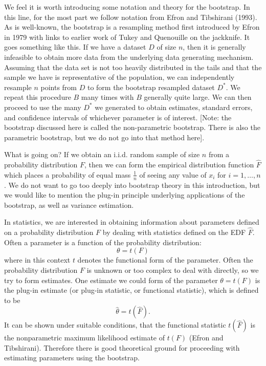 \documentclass[12pt,twoside]{reedthesis}
\theoremstyle{definition}
\theoremstyle{definition}
\theoremstyle{definition}
\theoremstyle{remark}
\begin{document}
We feel it is worth introducing some notation and theory for the
bootstrap. In this line, for the most part we follow notation from Efron
and Tibshirani (1993). As is well-known, the bootstrap is a resampling
method first introduced by Efron in 1979 with links to earlier work of
Tukey and Quenouille on the jackknife. It goes something like this. If
we have a dataset \(D\) of size \(n\), then it is generally infeasible
to obtain more data from the underlying data generating mechanism.
Assuming that the data set is not too heavily distributed in the tails
and that the sample we have is representative of the population, we can
independently resample \(n\) points from \(D\) to form the bootstrap
resampled dataset \(D^*\). We repeat this procedure \(B\) many times
with \(B\) generally quite large. We can then proceed to use the many
\(D^*\) we generated to obtain estimates, standard errors, and
confidence intervals of whichever parameter is of interest. {[}Note: the
bootstrap discussed here is called the non-parametric bootstrap. There
is also the parametric bootstrap, but we do not go into that method
here{]}.

What is going on? If we obtain an i.i.d. random sample of size \(n\)
from a probability distribution \(F\), then we can form the empirical
distribution function \(\hat{F}\) which places a probability of equal
mass \(\frac{1}{n}\) of seeing any value of \(x_i\) for
\(i=1,\ldots,n\). We do not want to go too deeply into bootstrap theory
in this introduction, but we would like to mention the plug-in principle
underlying applications of the bootstrap, as well as variance
estimation.

In statistics, we are interested in obtaining information about
parameters defined on a probability distribution \(F\) by dealing with
statistics defined on the EDF \(\hat{F}\). Often a parameter is a
function of the probability distribution: \[\theta=t(F)\] where in this
context \(t\) denotes the functional form of the parameter. Often the
probability distribution \(F\) is unknown or too complex to deal with
directly, so we try to form estimates. One estimate we could form of the
parameter \(\theta=t(F)\) is the plug-in estimate (or plug-in statistic,
or functional statistic), which is defined to be
\[\hat{\theta}=t(\hat{F}).\] It can be shown under suitable conditions,
that the functional statistic \(t(\hat{F})\) is the nonparametric
maximum likelihood estimate of \(t(F)\) (Efron and Tibshirani).
Therefore there is good theoretical ground for proceeding with
estimating parameters using the bootstrap.
\end{document}
